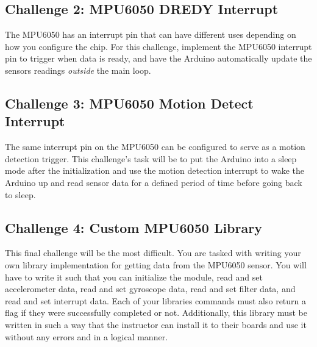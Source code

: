     \subsection*{Challenge 2: MPU6050 DREDY Interrupt}
    The MPU6050 has an interrupt pin that can have different uses depending on how you configure the chip.
    For this challenge, implement the MPU6050 interrupt pin to trigger when data is ready, and have the Arduino automatically update the sensors readings \emph{outside} the main loop.

    \subsection*{Challenge 3: MPU6050 Motion Detect Interrupt}
    The same interrupt pin on the MPU6050 can be configured to serve as a motion detection trigger.
    This challenge's task will be to put the Arduino into a sleep mode after the initialization and use the motion detection interrupt to wake the Arduino up and read sensor data for a defined period of time before going back to sleep.
    
    \subsection*{Challenge 4: Custom MPU6050 Library}
    This final challenge will be the most difficult. You are tasked with writing your own library implementation for getting data from the MPU6050 sensor.
    You will have to write it such that you can initialize the module, read and set accelerometer data, read and set gyroscope data, read and set filter data, and read and set interrupt data.
    Each of your libraries commands must also return a flag if they were successfully completed or not.
    Additionally, this library must be written in such a way that the instructor can install it to their boards and use it without any errors and in a logical manner.
